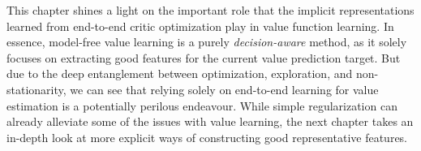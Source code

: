 This chapter shines a light on the important role that the implicit representations learned from end-to-end critic optimization play in value function learning.
In essence, model-free value learning is a purely \emph{decision-aware} method, as it solely focuses on extracting good features for the current value prediction target.
But due to the deep entanglement between optimization, exploration, and non-stationarity, we can see that relying solely on end-to-end learning for value estimation is a potentially perilous endeavour.
While simple regularization can already alleviate some of the issues with value learning,  the next chapter takes an in-depth look at more explicit ways of constructing good representative features.
